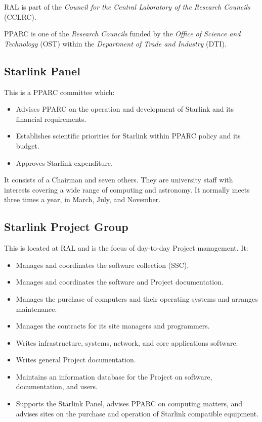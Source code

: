 \documentclass[twoside,11pt]{article}
\newcommand{\htmladdnormallink}[2]{#1}
\begin{document}
RAL is part of the
{\em Council for the Central Laboratory of the Research Councils}\/ 
(\htmladdnormallink{CCLRC}{http://www.cclrc.ac.uk/}).

PPARC is one of the
{\em \htmladdnormallink{Research Councils}
{http://www.nerc.ac.uk/joint_res_councils.html}}
funded by the
{\em Office of Science and Technology}\/ 
(\htmladdnormallink{OST}
{http://www.open.gov.uk/ost/osthome.htm}) 
within the
{\em Department of Trade and Industry}\/ 
(\htmladdnormallink{DTI}{http://www.dti.gov.uk/}).

\subsection*{Starlink Panel}

This is a PPARC committee which:

\begin{itemize}
\item Advises PPARC on the operation and development of Starlink and its
financial requirements.
\item Establishes scientific priorities for Starlink within PPARC policy and its
budget.
\item Approves Starlink expenditure.
\end{itemize}
It consists of a Chairman and seven others.
They are university staff with interests covering a wide range of computing
and astronomy.
It normally meets three times a year, in March, July, and November.

\newpage

\subsection*{Starlink Project Group}

This is located at RAL and is the focus of day-to-day Project management.
It:
\begin{itemize}
\item Manages and coordinates the software collection (SSC).
\item Manages and coordinates the software and Project documentation.
\item Manages the purchase of computers and their operating systems and
arranges maintenance.
\item Manages the contracts for its site managers and programmers.
\item Writes infrastructure, systems, network, and core applications software.
\item Writes general Project documentation.
\item Maintains an information database for the Project on software,
 documentation, and users.
\item Supports the Starlink Panel, advises PPARC on computing matters, and
advises sites on the purchase and operation of Starlink compatible equipment.
\end{itemize}
\end{document}
